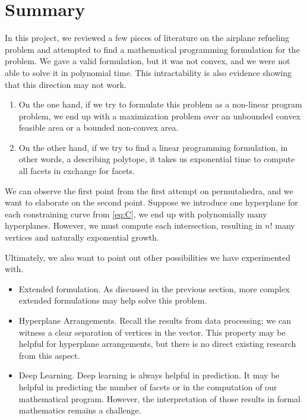 \documentclass[12pt,letterpaper]{article}
\begin{document}
\section{Summary}
In this project, we reviewed a few pieces of literature on the airplane refueling problem and 
attempted to find a mathematical programming formulation for the problem. 
We gave a valid formulation, but it was not convex, and we were not able to solve it in polynomial time. 
This intractability is also evidence showing that this direction may not work.
\begin{enumerate}
    \item On the one hand, if we try to formulate this problem as a non-linear program problem, we end up 
 with a maximization problem over an unbounded convex feasible area or a bounded non-convex area. 
    \item On the other hand, if we try to find a linear programming formulation, in other words, a describing polytope, 
 it takes us exponential time to compute all facets in exchange for facets. 
\end{enumerate}
We can observe the first point from the first attempt on permutahedra, and we want to elaborate on the second point. 
Suppose we introduce one hyperplane for each constraining curve from \ref{eq:C}, we end up with polynomially many hyperplanes. 
However, we must compute each intersection, resulting in $n!$ many vertices and naturally exponential growth. 

Ultimately, we also want to point out other possibilities we have experimented with.
\begin{itemize}
    \item Extended formulation. As discussed in the previous section, more complex extended formulations may help solve this 
 problem. 
    \item Hyperplane Arrangements. Recall the results from data processing; we can witness a clear separation of vertices in the vector. 
 This property may be helpful for hyperplane arrangements, but there is no direct existing research from this aspect. 
    \item Deep Learning. Deep learning is always helpful in prediction. It may be helpful in predicting the number of facets or in the
 computation of our mathematical program. However, the interpretation of those results in formal mathematics remains a challenge. 
\end{itemize}



\end{document}
